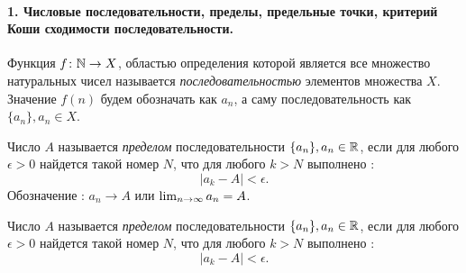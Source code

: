 \paragraph*{1. Числовые последовательности, пределы, предельные точки, критерий Коши сходимости последовательности.}

\begin{defin}
	Функция \(f\colon\mathbb{N}\to X\), областью определения которой является все множество натуральных чисел называется \textit{последовательностью} элементов множества \(X\). Значение \(f(n)\) будем обозначать как \(a_n\), а саму последовательность как \(\{a_n\}, a_n\in X\).
\end{defin}

\begin{defin}
	Число \(A\) называется \textit{пределом} последовательности \(\{a_n\}, a_n\in\mathbb{R}\), если для любого \(\epsilon > 0\) найдется такой номер \(N\), что для любого \(k > N\) выполнено : \[|a_k-A| < \epsilon.\] Обозначение : \(a_n\to A\) или \(\lim_{n\to\infty}a_n\hm=A\).
\end{defin}

\begin{defin}
	Число \(A\) называется \textit{пределом} последовательности \(\{a_n\}, a_n\in\mathbb{R}\), если для любого \(\epsilon > 0\) найдется такой номер \(N\), что для любого \(k > N\) выполнено : \[|a_k-A| < \epsilon.\]
\end{defin}